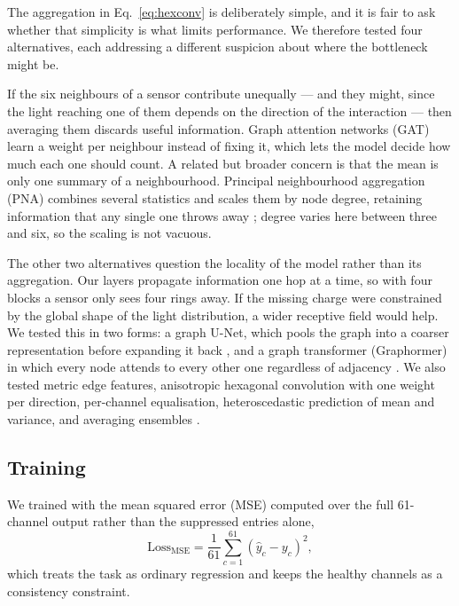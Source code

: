 \documentclass[10pt,conference]{IEEEtran}
\begin{document}
The aggregation in Eq.~\ref{eq:hexconv} is deliberately simple, and it is fair
to ask whether that simplicity is what limits performance. We therefore tested
four alternatives, each addressing a different suspicion about where the
bottleneck might be.

If the six neighbours of a sensor contribute unequally --- and they might, since
the light reaching one of them depends on the direction of the interaction ---
then averaging them discards useful information. Graph attention networks (GAT)
\cite{velickovic2018gat} learn a weight per neighbour instead of fixing it,
which lets the model decide how much each one should count. A related but
broader concern is that the mean is only one summary of a neighbourhood.
Principal neighbourhood aggregation (PNA) combines several statistics and
scales them by node degree, retaining information that any single one throws
away \cite{corso2020pna}; degree varies here between three and six, so the
scaling is not vacuous.

The other two alternatives question the locality of the model rather than its
aggregation. Our layers propagate information one hop at a time, so with four
blocks a sensor only sees four rings away. If the missing charge were
constrained by the global shape of the light distribution, a wider receptive
field would help. We tested this in two forms: a graph U-Net, which pools the
graph into a coarser representation before expanding it back
\cite{gao2019graphunet}, and a graph transformer (Graphormer) in which every
node attends to every other one regardless of adjacency
\cite{ying2021graphormer}. We also tested metric edge features, anisotropic
hexagonal convolution with one weight per direction, per-channel equalisation,
heteroscedastic prediction of mean and variance, and averaging ensembles
\cite{lakshminarayanan2017ensembles}.

\subsection{Training}
\label{sec:training}

We trained with the mean squared error (MSE) computed over the full 61-channel
output rather than the suppressed entries alone,
%
\begin{equation}
\mathrm{Loss}_{\mathrm{MSE}} = \frac{1}{61} \sum_{c=1}^{61}
              \left( \hat{y}_{c} - y_{c} \right)^{2},
\label{eq:loss}
\end{equation}
%
which treats the task as ordinary regression and keeps the healthy channels as
a consistency constraint.
\end{document}
